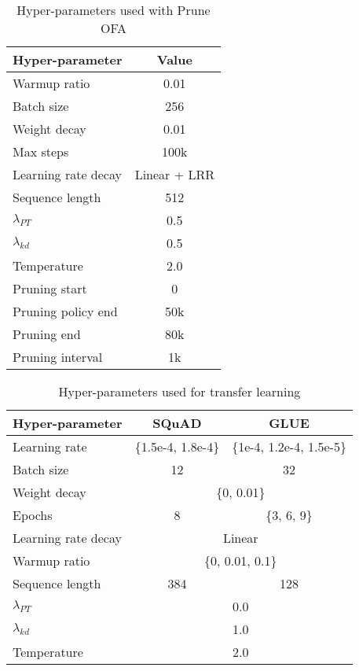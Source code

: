 \documentclass{article}
\begin{document}
\begin{table}[t]
\centering
\caption{Hyper-parameters used with Prune OFA}
\label{tab:hyper-pofa}
\begin{tabular}{@{}lc@{}}
\toprule
Hyper-parameter & Value \\ \midrule
Warmup ratio & 0.01 \\
Batch size & 256 \\
Weight decay & 0.01 \\
Max steps & 100k \\
Learning rate decay & Linear + LRR \\
Sequence length & 512 \\
$\lambda_{PT}$ & 0.5 \\
$\lambda_{kd}$ & 0.5 \\
Temperature & 2.0 \\
Pruning start & 0 \\
Pruning policy end & 50k \\
Pruning end & 80k \\
Pruning interval & 1k \\ \bottomrule
\end{tabular}\end{table}

\begin{table}[t]
\centering
\caption{Hyper-parameters used for transfer learning}
\label{tab:hyper-transfer}
\begin{tabular}{@{}lcc@{}}
\toprule
Hyper-parameter & SQuAD & GLUE \\ \midrule
Learning rate & \{1.5e-4, 1.8e-4\} & \{1e-4, 1.2e-4, 1.5e-5\} \\
Batch size & 12 & 32 \\
Weight decay & \multicolumn{2}{c}{\{0, 0.01\}} \\
Epochs & 8 & \{3, 6, 9\} \\
Learning rate decay & \multicolumn{2}{c}{Linear} \\
Warmup ratio & \multicolumn{2}{c}{\{0, 0.01, 0.1\}} \\
Sequence length & 384 & 128 \\
$\lambda_{PT}$ & \multicolumn{2}{c}{0.0} \\
$\lambda_{kd}$ & \multicolumn{2}{c}{1.0} \\
Temperature & \multicolumn{2}{c}{2.0} \\ \bottomrule
\end{tabular}\end{table}
\end{document}

